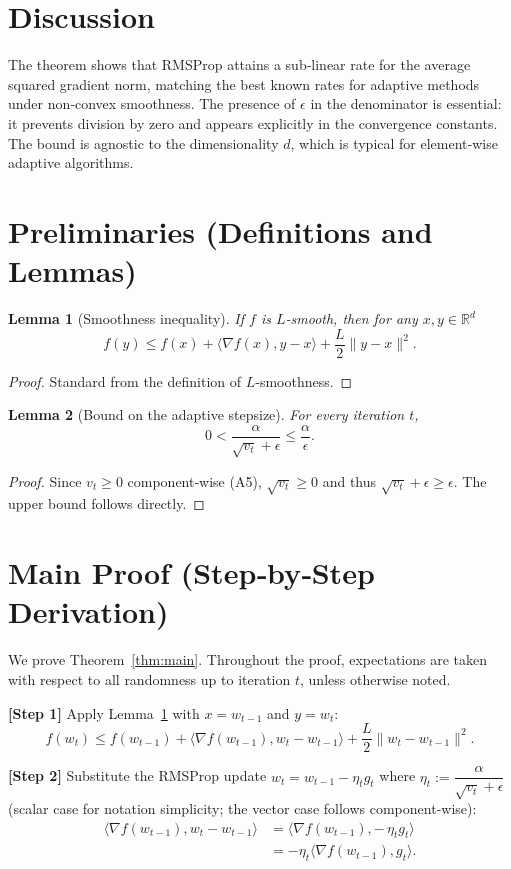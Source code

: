 \documentclass{article}
\newtheorem{lemma}{Lemma}
\newcommand{\RR}{\mathbb{R}}
\begin{document}
\section*{Discussion}
The theorem shows that RMSProp attains a sub‑linear rate for the average squared gradient norm, matching the best known rates for adaptive methods under non‑convex smoothness. The presence of $\epsilon$ in the denominator is essential: it prevents division by zero and appears explicitly in the convergence constants. The bound is agnostic to the dimensionality $d$, which is typical for element‑wise adaptive algorithms.

\newpage

\section*{Preliminaries (Definitions and Lemmas)}
\begin{lemma}[Smoothness inequality]\label{lem:smooth}
If $f$ is $L$‑smooth, then for any $x,y\in\RR^{d}$
\[
f(y)\le f(x)+\langle\nabla f(x),y-x\rangle+\frac{L}{2}\|y-x\|^{2}.
\]
\end{lemma}
\begin{proof}
Standard from the definition of $L$‑smoothness. \qedhere
\end{proof}

\begin{lemma}[Bound on the adaptive stepsize]\label{lem:stepsize}
For every iteration $t$,
\[
0<\frac{\alpha}{\sqrt{v_{t}}+\epsilon}\le\frac{\alpha}{\epsilon}.
\]
\end{lemma}
\begin{proof}
Since $v_{t}\ge0$ component‑wise (A5), $\sqrt{v_{t}}\ge0$ and thus $\sqrt{v_{t}}+\epsilon\ge\epsilon$. The upper bound follows directly. \qedhere
\end{proof}

\section*{Main Proof (Step‑by‑Step Derivation)}
We prove Theorem~\ref{thm:main}. Throughout the proof, expectations are taken with respect to all randomness up to iteration $t$, unless otherwise noted.

\bigskip
\noindent\textbf{[Step 1]} Apply Lemma~\ref{lem:smooth} with $x=w_{t-1}$ and $y=w_{t}$:
\[
f(w_{t})\le f(w_{t-1})+\langle\nabla f(w_{t-1}),w_{t}-w_{t-1}\rangle+\frac{L}{2}\|w_{t}-w_{t-1}\|^{2}. \tag{1}
\]

\noindent\textbf{[Step 2]} Substitute the RMSProp update $w_{t}=w_{t-1}-\eta_{t}g_{t}$ where $\eta_{t}:=\dfrac{\alpha}{\sqrt{v_{t}}+\epsilon}$ (scalar case for notation simplicity; the vector case follows component‑wise):
\[
\begin{aligned}
\langle\nabla f(w_{t-1}),w_{t}-w_{t-1}\rangle
&= \langle\nabla f(w_{t-1}),-\,\eta_{t}g_{t}\rangle\\
&= -\eta_{t}\langle\nabla f(w_{t-1}),g_{t}\rangle .
\end{aligned}
\tag{2}
\]
\end{document}
